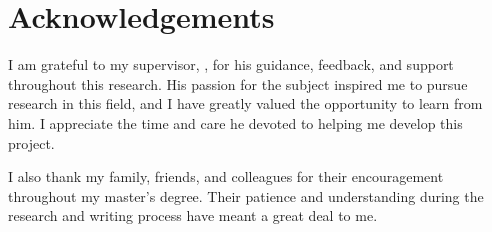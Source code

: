 \chapter*{Acknowledgements}

I am grateful to my supervisor, \thesissupervisor, for his guidance,
feedback, and support throughout this research. His passion for the subject
inspired me to pursue research in this field, and I have greatly valued the
opportunity to learn from him. I appreciate the time and care he devoted to
helping me develop this project.

I also thank my family, friends, and colleagues for their encouragement
throughout my master's degree. Their patience and understanding during the
research and writing process have meant a great deal to me.
